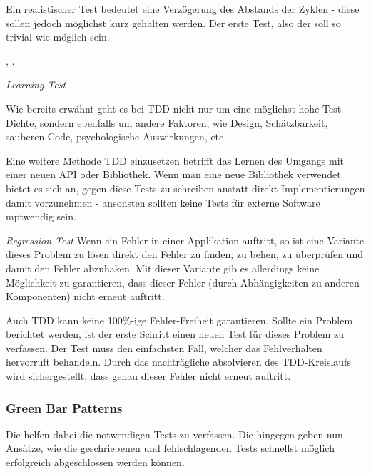 Ein realistischer Test bedeutet eine Verzögerung des Abstands der  Zyklen - diese sollen jedoch möglichst kurz gehalten werden.
Der erste Test, also der  soll so trivial wie möglich sein.

, \cite[134]{Beck:2003}.\newline\newline

\textit{Learning Test}

Wie bereits erwähnt geht es bei TDD nicht nur um eine möglichst hohe Test-Dichte, sondern ebenfalls um andere Faktoren, wie Design, Schätzbarkeit, sauberen Code, psychologische Auswirkungen, etc.

Eine weitere Methode TDD einzusetzen betrifft das Lernen des Umgangs mit einer neuen API oder Bibliothek. Wenn man eine neue Bibliothek verwendet bietet es sich an, gegen diese Tests zu schreiben anstatt direkt Implementierungen damit vorzunehmen - ansonsten sollten keine Tests für externe Software mptwendig sein.\newline\newline

\textit{Regression Test}
Wenn ein Fehler in einer Applikation auftritt, so ist eine Variante dieses Problem zu lösen direkt den Fehler zu finden, zu behen, zu überprüfen und damit den Fehler abzuhaken. Mit dieser Variante gib es allerdings keine Möglichkeit zu garantieren, dass dieser Fehler (durch Abhängigkeiten zu anderen Komponenten) nicht erneut auftritt.

Auch TDD kann keine 100\%-ige Fehler-Freiheit garantieren. Sollte ein Problem berichtet werden, ist der erste Schritt einen neuen Test für dieses Problem zu verfassen. Der Test muss den einfachsten Fall, welcher das Fehlverhalten hervorruft behandeln. Durch das nachträgliche absolvieren des TDD-Kreislaufs wird sichergestellt, dass genau dieser Fehler nicht erneut auftritt.

\subsubsection{Green Bar Patterns}

Die  helfen dabei die notwendigen Tests zu verfassen. Die  hingegen geben nun Ansätze, wie die geschriebenen und fehlschlagenden Tests schnellst möglich erfolgreich abgeschlossen werden können.\newline\newline

